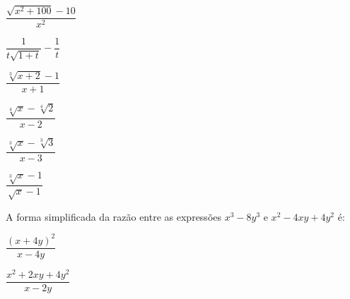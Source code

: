 \begin{secExercicios}
\begin{exer}
\begin{enumerate}[a)]
\begin{multicols}{2}
        \item $\dfrac{\sqrt{x^2 + 100} -10}{x^2}$
        
        \item $\dfrac{1}{t \sqrt{1 + t}} - \dfrac{1}{t}$
        
        \item $\dfrac{\sqrt[3]{x+2} -1}{x+1}$
  
        \item $\dfrac{\sqrt[4]{x} - \sqrt[4]{2}}{x-2}$
        
        \item $\dfrac{\sqrt[3]{x} - \sqrt[3]{3}}{x-3}$
  
        \item $\dfrac{\sqrt[3]{x}-1 }{\sqrt{x} - 1}$
  \end{multicols}\end{enumerate}
\end{exer}


  
        
        
        
        
  

\begin{exer}
  A forma simplificada da razão entre as expressões $x^3 - 8y^3$ e $x^2 - 4xy + 4y^2$ é:
  \begin{enumerate}[a)]\begin{multicols}{2}
        \item $\dfrac{(x+4y)^2}{x-4y}$
        
         \item $\dfrac{x^2 + 2xy + 4y^2}{x-2y}$
        

\end{multicols}
\end{enumerate}
\end{exer}
\end{secExercicios}
